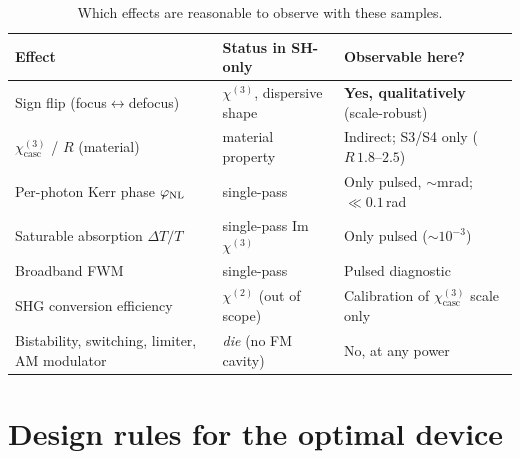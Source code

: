 \documentclass[11pt,a4paper]{article}
\newcommand{\chitwo}{\chi^{(2)}}
\newcommand{\chithree}{\chi^{(3)}}
\newcommand{\chicasc}{\chithree_{\text{casc}}}
\begin{document}
\begin{table}[H]
  \centering
  \caption{Which effects are reasonable to observe with these samples.}
  \label{tab:verdict}
  \small
  \setlength{\tabcolsep}{5pt}
  \begin{tabular}{@{}p{4.5cm}p{3.6cm}p{4.7cm}@{}}
    \toprule
    Effect & Status in SH-only & Observable here? \\
    \midrule
    Sign flip (focus$\leftrightarrow$defocus) & $\chithree$, dispersive shape & \textbf{Yes, qualitatively} (scale-robust) \\
    $\chicasc$ / $R$ (material)      & material property       & Indirect; S3/S4 only ($R\,1.8$--$2.5$) \\
    Per-photon Kerr phase $\varphi_{\rm NL}$  & single-pass     & Only pulsed, $\sim$mrad; $\ll0.1$\,rad \\
    Saturable absorption $\Delta T/T$ & single-pass Im $\chithree$ & Only pulsed ($\sim\!10^{-3}$) \\
    Broadband FWM                    & single-pass             & Pulsed diagnostic \\
    SHG conversion efficiency       & $\chitwo$ (out of scope) & Calibration of $\chicasc$ scale only \\
    Bistability, switching, limiter, AM modulator & \emph{die} (no FM cavity) & No, at any power \\
    \bottomrule
  \end{tabular}
\end{table}

\section{Design rules for the optimal device}
\label{sec:rules}
\end{document}
